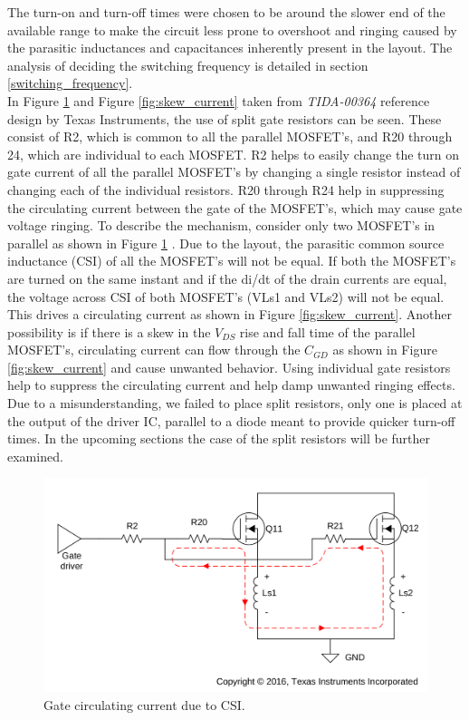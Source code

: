 The turn-on and turn-off times were chosen to be around the slower end of the available range to make the circuit less prone to overshoot and ringing caused by the parasitic inductances and capacitances inherently present in the layout. The analysis of deciding the switching frequency is detailed in section \ref{switching_frequency}. \\

In Figure \ref{fig:CSI_current} and Figure \ref{fig:skew_current} taken from \textit{TIDA-00364}\cite{TIDA-00364} reference design by Texas Instruments, the use of split gate resistors can be seen. These consist of R2, which is common to all the parallel MOSFET's, and R20 through 24, which are individual to each MOSFET. 
R2 helps to easily change the turn on gate current of all the parallel MOSFET's by changing a single resistor instead of changing each of the individual resistors. R20 through R24 help in suppressing the circulating current between the gate of the MOSFET's, which may cause gate voltage ringing. To describe the mechanism, consider only two MOSFET's in parallel as shown in Figure \ref{fig:CSI_current} . 
Due to the layout, the parasitic common source inductance (CSI) of all the MOSFET's will not be equal. If both the MOSFET's are turned on the same instant and if the di/dt of the drain currents are equal, the voltage across CSI of both MOSFET's (VLs1 and VLs2) will not be equal. This drives a circulating current as shown in Figure \ref{fig:skew_current}. 
Another possibility is if there is a skew in the $V_{DS}$ rise and fall time of the parallel MOSFET's, circulating current can flow through the $C_{GD}$ as shown in Figure \ref{fig:skew_current} and cause unwanted behavior. 
Using individual gate resistors help to suppress the circulating current and help damp unwanted ringing effects. Due to a misunderstanding, we failed to place split resistors, only one is placed at the output of the driver IC, parallel to a diode meant to provide quicker turn-off times. In the upcoming sections the case of the split resistors will be further examined.%

\begin{figure}[H]
	\centering
	\includegraphics[width=0.85\linewidth]{pictures/hardware/Driver_Board/CSI.png}
	\caption{Gate circulating current due to CSI.}
	\label{fig:CSI_current}
\end{figure}

